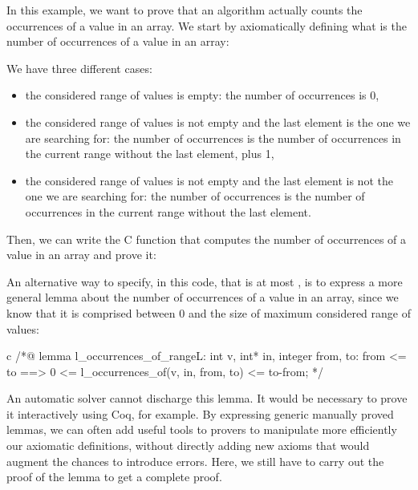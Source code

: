 In this example, we want to prove that an algorithm actually counts the
occurrences of a value in an array. We start by axiomatically defining
what is the number of occurrences of a value in an array:






We have three different cases:
\begin{itemize}
\item
  the considered range of values is empty: the number of occurrences is
  0,
\item
  the considered range of values is not empty and the last element is
  the one we are searching for: the number of occurrences is the number of
  occurrences in the current range without the last element, plus 1,
\item
  the considered range of values is not empty and the last element is
  not the one we are searching for: the number of occurrences is the number
  of occurrences in the current range without the last element.
\end{itemize}
Then, we can write the C function that computes the number of
occurrences of a value in an array and prove it:






An alternative way to specify, in this code, that  is at
most , is to express a more general lemma about the number of
occurrences of a value in an array, since we know that it is
comprised between 0 and the size of maximum considered range of values:



\begin{CodeBlock}{c}
/*@
lemma l_occurrences_of_range{L}:
  \forall int v, int* in, integer from, to:
    from <= to ==> 0 <= l_occurrences_of(v, in, from, to) <= to-from;
*/
\end{CodeBlock}



An automatic solver cannot discharge this lemma. It would be necessary
to prove it interactively using Coq, for example. By expressing generic
manually proved lemmas, we can often add useful tools to provers to
manipulate more efficiently our axiomatic definitions, without directly
adding new axioms that would augment the chances to introduce errors.
Here, we still have to carry out the proof of the lemma to get a complete
proof.


